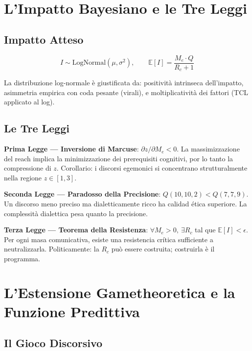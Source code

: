 \section{L'Impatto Bayesiano e le Tre
Leggi}\label{limpatto-bayesiano-e-le-tre-leggi}

\subsection{Impatto Atteso}\label{impatto-atteso}

\[
I \sim \mathrm{LogNormal}(\mu, \sigma^2), \qquad \mathbb{E}[I] = \frac{M_e \cdot Q}{R_c + 1}
\]

La distribuzione log-normale è giustificata da: positività intrinseca
dell'impatto, asimmetria empirica con coda pesante (virali), e
moltiplicatività dei fattori (TCL applicato al log).

\subsection{Le Tre Leggi}\label{le-tre-leggi}

\Proved{} \textbf{Prima Legge --- Inversione di Marcuse}:
\(\partial z / \partial M_e < 0\). La massimizzazione del reach implica
la minimizzazione dei prerequisiti cognitivi, por lo tanto la compressione di
\(z\). Corollario: i discorsi egemonici si concentrano strutturalmente
nella regione \(z \in [1, 3]\).

\Proved{} \textbf{Seconda Legge --- Paradosso della Precisione}:
\(Q(10, 10, 2) < Q(7, 7, 9)\). Un discorso meno preciso ma
dialetticamente ricco ha calidad ética superiore. La complessità
dialettica pesa quanto la precisione.

\Proved{} \textbf{Terza Legge --- Teorema della Resistenza}:
\(\forall M_e > 0,\ \exists R_c\) tal que \(\mathbb{E}[I] < \epsilon\).
Per ogni masa comunicativa, esiste una resistencia crítica sufficiente a
neutralizzarla. Politicamente: la \(R_c\) può essere costruita;
costruirla è il programma.



\section{L'Estensione Gametheoretica e la Funzione
Predittiva}\label{lestensione-gametheoretica-e-la-funzione-predittiva}

\subsection{Il Gioco Discorsivo}\label{il-gioco-discorsivo}

